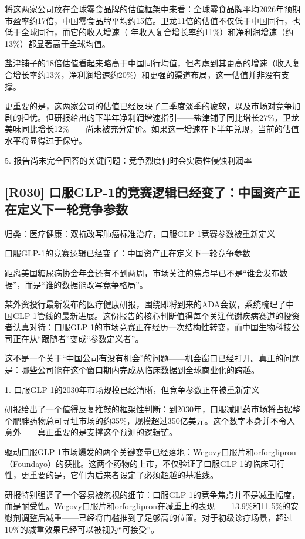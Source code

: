 \documentclass[11pt]{ctexart}
\begin{document}
将这两家公司放在全球零食品牌的估值框架中来看：全球零食品牌平均2026年预期市盈率约17倍，中国零食品牌平均约15倍。卫龙11倍的估值不仅低于中国同行，也低于全球同行，而它的收入增速（ 年收入复合增长率约11\%）和净利润增速（约13\%）都显著高于全球均值。

盐津铺子的18倍估值看起来略高于中国同行均值，但考虑到其更高的增速（收入复合增长率约13\%，净利润增速约20\%）和更强的渠道布局，这一估值并非没有支撑。

更重要的是，这两家公司的估值已经反映了二季度淡季的疲软，以及市场对竞争加剧的担忧。但研报给出的下半年净利润增速指引——盐津铺子同比增长27\%，卫龙美味同比增长12\%——尚未被充分定价。如果这一增速在下半年兑现，当前的估值水平将显得过于保守。

5. 报告尚未完全回答的关键问题：竞争烈度何时会实质性侵蚀利润率

\subsection{[R030] 口服GLP-1的竞赛逻辑已经变了：中国资产正在定义下一轮竞争参数}
{\small\color{refgray}归类：医疗健康：双抗改写肺癌标准治疗，口服GLP-1竞赛参数被重新定义}

口服GLP-1的竞赛逻辑已经变了：中国资产正在定义下一轮竞争参数

距离美国糖尿病协会年会还有不到两周，市场关注的焦点早已不是“谁会发布数据”，而是“谁的数据能改写竞争格局”。

某外资投行最新发布的医疗健康研报，围绕即将到来的ADA会议，系统梳理了中国GLP-1管线的最新进展。这份报告的核心判断值得每个关注代谢疾病赛道的投资者认真对待：口服GLP-1的市场竞赛正在经历一次结构性转变，而中国生物科技公司正在从“跟随者”变成“参数定义者”。

这不是一个关于“中国公司有没有机会”的问题——机会窗口已经打开。真正的问题是：哪些公司能在这个窗口期内完成从临床数据到全球商业化的跨越。

1. 口服GLP-1的2030年市场规模已经清晰，但竞争参数正在被重新定义

研报给出了一个值得反复推敲的框架性判断：到2030年，口服减肥药市场将占据整个肥胖药物总可寻址市场的约35\%，规模超过350亿美元。这个数字本身并不令人意外——真正重要的是支撑这个预测的逻辑链。

驱动口服GLP-1市场爆发的两个关键变量已经落地：Wegovy口服片和orforglipron（Foundayo）的获批。这两个药物的上市，不仅验证了口服GLP-1的临床可行性，更重要的是，它们为后来者设定了必须超越的基准线。

研报特别强调了一个容易被忽视的细节：口服GLP-1的竞争焦点并不是减重幅度，而是耐受性。Wegovy口服片和orforglipron在减重上的表现——13.9\%和11.5\%的安慰剂调整后减重——已经将门槛推到了足够高的位置。对于初级诊疗场景，超过10\%的减重效果已经可以被视为“可接受”。
\end{document}
